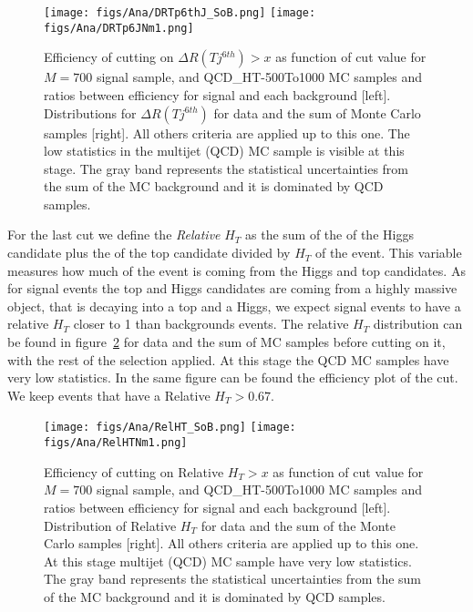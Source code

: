 \begin{figure}[!Hhtbp]
  \begin{center}
    \texttt{[image: figs/Ana/DRTp6thJ\_SoB.png]}
    \texttt{[image: figs/Ana/DRTp6JNm1.png]}
    \caption{Efficiency of cutting on $\Delta R (T j^{6th})>x$ as function of cut value for $M=700$ \GeVcc signal sample, \ttbar and QCD\_HT-500To1000 MC samples and ratios between efficiency for signal and each background [left]. Distributions for $\Delta R (T j^{6th})$  for data and the sum of Monte Carlo samples [right]. All others criteria are applied up to this one. The low statistics in the multijet (QCD) MC sample is visible at this stage. The gray band represents the statistical uncertainties from the sum of the MC background and it is dominated by QCD samples.}
    \label{fig:jet6}
  \end{center}
\end{figure}

For the last cut we define the \textit{Relative} $H_{T}$ as the sum of the \pt of the Higgs candidate plus the \pt of the top candidate divided by $H_{T}$ of the event. This variable measures how much \pt of the event is coming from the Higgs and top candidates. As for signal events the top and Higgs candidates are coming from a highly massive object, that is decaying into a top and a Higgs, we expect signal events to have a relative $H_{T}$ closer to 1 than backgrounds events. The relative $H_{T}$ distribution can be found in figure~\ref{fig:RelHtMass} for data and the sum of MC samples before cutting on it, with the rest of the selection applied. At this stage the QCD MC samples have very low statistics. In the same figure can be found the efficiency plot of the cut. We keep events that have a Relative $H_{T}>0.67$. 

\begin{figure}[!Hhtbp]
  \begin{center}
    \texttt{[image: figs/Ana/RelHT\_SoB.png]}
    \texttt{[image: figs/Ana/RelHTNm1.png]}
    \caption{Efficiency of cutting on Relative $H_{T}>x$ as function of cut value for $M=700$ \GeVcc signal sample, \ttbar and QCD\_HT-500To1000 MC samples and ratios between efficiency for signal and each background [left]. Distribution of Relative $H_{T}$ for data and the sum of the Monte Carlo samples [right]. All others criteria are applied up to this one. At this stage multijet (QCD) MC sample have very low statistics. The gray band represents the statistical uncertainties from the sum of the MC background and it is dominated by QCD samples.}
    \label{fig:RelHtMass}
  \end{center}
\end{figure}

